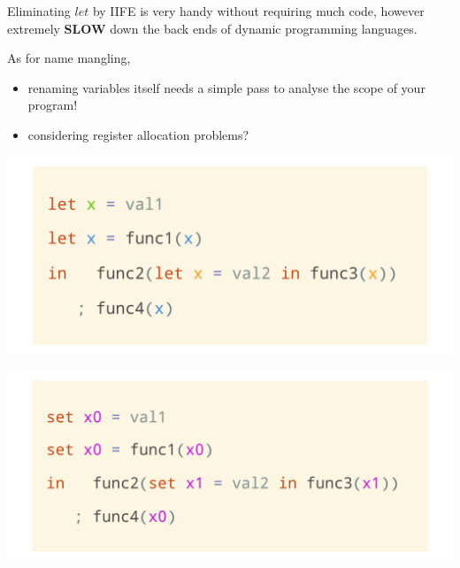 \documentclass[a1,portrait]{a1poster}
\begin{document}
\begin{multicols}{2}
\begin{multicols}{3}
\end{multicols}

 Eliminating $let$ by IIFE is very handy without requiring much code, however
 extremely \textbf{SLOW} down the back ends of dynamic programming languages.

 As for name mangling,

\begin{itemize}
    \setlength\itemsep{-0.2em}
    \item renaming variables itself needs a simple pass to analyse the scope of your program!
    \item considering register allocation problems?
\end{itemize}

\begin{multicols}{2}

\begin{minipage}[b]{1\linewidth}
\begin{center}\vspace{0.1cm}
    \includegraphics[width=0.9\linewidth]{figs/let-occur.png}
\end{center}\vspace{0.1cm}
\end{minipage}

\begin{minipage}[b]{1\linewidth}
\begin{center}\vspace{0.1cm}
    \includegraphics[width=0.9\linewidth]{figs/let-realloc.png}
\end{center}\vspace{0.1cm}
\end{minipage}
\end{multicols}


\end{multicols}
\end{document}
